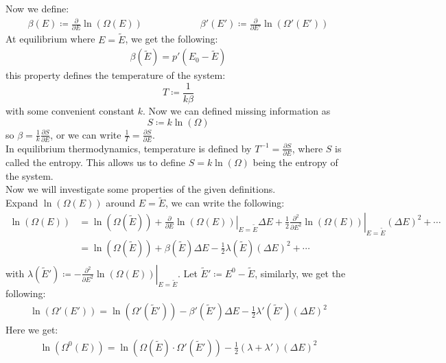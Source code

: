 \documentclass[11pt]{article}
\theoremstyle{break}
\theoremstyle{break}
\begin{document}
Now we define:
\begin{align*}
\beta(E) \coloneqq \frac{\partial}{\partial E}\ln (\Omega(E))\qquad\qquad\qquad\beta'(E') \coloneqq \frac{\partial}{\partial E'}\ln (\Omega'(E'))
\end{align*}
At equilibrium where $E = \widetilde{E}$, we get the following:
\begin{align*}
\beta(\widetilde{E}) = p'(E_0-\widetilde{E})
\end{align*}
this property defines the temperature of the system:
$$T \coloneqq \frac{1}{k\beta}$$
with some convenient constant $k$. Now we can defined missing information as $$S \coloneqq k\ln(\Omega)$$ 
so $\beta = \frac{1}{k}\frac{\partial S}{\partial E}$, or we can write $\frac{1}{T} = \frac{\partial S}{\partial E}$. \\


In equilibrium thermodynamics, temperature is defined by $T^{-1} =\frac{\partial S}{\partial E}$, where $S$ is called the entropy. This allows us to define $S =k\ln(\Omega)$ being the entropy of the system. \\

Now we will investigate some properties of the given definitions. \\
Expand $\ln(\Omega(E))$ around $E = \widetilde{E}$, we can write the following:
\begin{align*}
\ln(\Omega(E)) &= \ln(\Omega(\widetilde{E})) + \left.\frac{\partial}{\partial E}\ln(\Omega(E))\right|_{E=\widetilde{E}} \Delta E + \left.\frac{1}{2}\frac{\partial^2}{\partial E^2}\ln(\Omega(E))\right|_{E=\widetilde{E}} (\Delta E)^2 + \cdots \\
&= \ln(\Omega(\widetilde{E})) + \beta(\widetilde{E}) \Delta E - \frac{1}{2}\lambda(\widetilde{E})(\Delta E)^2 + \cdots\\
\end{align*}
with $\lambda(\widetilde{E}') \coloneqq -\left.\frac{\partial^2}{\partial E^2}\ln(\Omega(E)) \right|_{E = \widetilde{E}}$. Let $\widetilde{E}'\coloneqq E^0 - \widetilde{E}$, similarly, we get the following:
\begin{align*}
\ln(\Omega'(E')) = \ln(\Omega'(\widetilde{E}')) - \beta'(\widetilde{E}') \Delta E - \frac{1}{2}\lambda'(\widetilde{E}') (\Delta E)^2
\end{align*}
Here we get:
\begin{align*}
\ln(\Omega^0(E)) = \ln(\Omega(\widetilde{E})\cdot \Omega'(\widetilde{E}')) - \frac{1}{2}(\lambda+\lambda') (\Delta E)^2
\end{align*}
\end{document}
